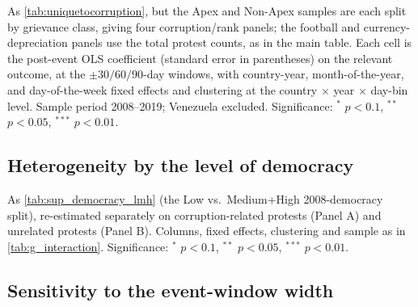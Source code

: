 \documentclass[11pt]{article}
\begin{document}
\begin{table}[htb!]
    \caption{\autoref{tab:uniquetocorruption} split by protest grievance.}
    \label{tab:g_benchmarks}
    \begin{center}
        \scriptsize{}
    \end{center}
    \footnotesize{As \autoref{tab:uniquetocorruption}, but the Apex and Non-Apex samples are each split by grievance class, giving four corruption/rank panels; the football and currency-depreciation panels use the total protest counts, as in the main table. Each cell is the post-event OLS coefficient (standard error in parentheses) on the relevant outcome, at the $\pm30/60/90$-day windows, with country-year, month-of-the-year, and day-of-the-week fixed effects and clustering at the country $\times$ year $\times$ day-bin level. Sample period 2008--2019; Venezuela excluded. Significance: $^{*}$ $p<0.1$, $^{**}$ $p<0.05$, $^{***}$ $p<0.01$.}
\end{table}

\subsection{Heterogeneity by the level of democracy}

\begin{table}[htb!]
    \caption{\autoref{tab:sup_democracy_lmh} split by protest grievance.}
    \label{tab:g_democracy}
    \begin{center}
        \scriptsize{}
    \end{center}
    \footnotesize{As \autoref{tab:sup_democracy_lmh} (the Low vs.\ Medium+High 2008-democracy split), re-estimated separately on corruption-related protests (Panel A) and unrelated protests (Panel B). Columns, fixed effects, clustering and sample as in \autoref{tab:g_interaction}. Significance: $^{*}$ $p<0.1$, $^{**}$ $p<0.05$, $^{***}$ $p<0.01$.}
\end{table}

\subsection{Sensitivity to the event-window width}
\end{document}
